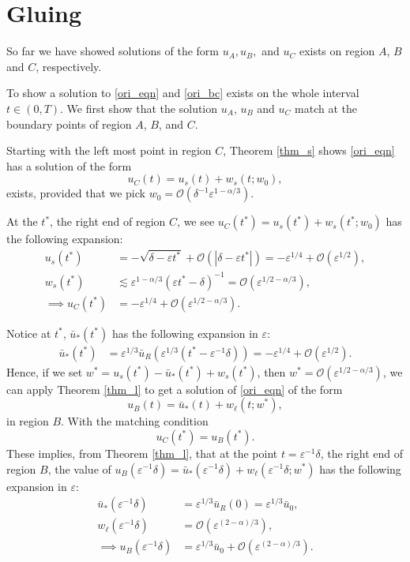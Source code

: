 \documentclass[letterpaper,11pt]{article}
\newcommand{\rmO}{\mathcal{O}}
\newcommand{\eps}{\varepsilon}
\newcommand{\lar}{ \lesssim }
\numberwithin{equation}{section}
\theoremstyle{plain}
\begin{document}
\section{Gluing}\label{sec_glue}
So far we have showed solutions of the form $u_A,u_B,$ and $u_C$ exists on region $A$, $B$ and $C$, respectively. 

To show a solution to \eqref{ori_eqn} and \eqref{ori_bc} exists on the whole interval $t\in (0, T)$. We first show that the solution $u_A$, $u_B$ and $u_C$ match at the boundary points of region $A$, $B$, and $C$.

Starting with the left most point in region $C$, Theorem \ref{thm_s} shows \eqref{ori_eqn} has
a solution of the form
\[
u_C(t) = u_s(t) + w_s(t;w_0),
\]
exists, provided that we pick $w_0= \rmO(\delta^{-1}\eps^{1-\alpha/3})$.

At the $t^*$, the right end of region $C$, we see $u_C(t^*) = u_s(t^*) + w_s(t^*; w_0)$ has the following expansion:
\begin{align*}
u_s(t^*) &= -\sqrt{\delta-\eps t^*}+\rmO(|\delta-\eps t^*|) = -\eps^{1/4}+\rmO(\eps^{1/2}),\\
w_s(t^*) &\lar \eps^{1-\alpha/3}(\eps t^*-\delta)^{-1} =  \rmO(\eps^{1/2-\alpha/3}),\\
\implies u_C(t^*) &= -\eps^{1/4} + \rmO(\eps^{1/2-\alpha/3}).
\end{align*}


Notice at $t^*$, $\bar{u}_*(t^*)$ has the following expansion in $\eps$:
\begin{align*}
\bar{u}_*(t^*) &= \eps^{1/3}\bar{u}_R(\eps^{1/3}(t^*-\eps^{-1}\delta)) = -\eps^{1/4}+ \rmO(\eps^{1/2}).
\end{align*}
Hence, if we set $w^* = u_s(t^*)-\bar{u}_*(t^*)+w_s(t^*)$, then $w^* = \rmO(\eps^{1/2-\alpha/3})$, we can apply Theorem \ref{thm_l} to get a solution of \eqref{ori_eqn} of the form
\[
u_B(t) = \bar{u}_*(t) + w_\ell(t; w^*),
\]
in region $B$. With the matching condition
\begin{equation} \label{match_bc}
u_C(t^*) = u_B(t^*).
\end{equation}
These implies, from Theorem \ref{thm_l}, that at the point $t=\eps^{-1}\delta$, the right end of region $B$, the value of $u_B(\eps^{-1}\delta) = \bar{u}_*(\eps^{-1}\delta)  + w_\ell(\eps^{-1}\delta; w^*)$ has the following expansion in $\eps$:
\begin{align*}
\bar{u}_*(\eps^{-1}\delta) &= \eps^{1/3}\bar{u}_R(0) = \eps^{1/3}\bar{u}_0, \\
w_\ell(\eps^{-1}\delta) &=  \rmO(\eps^{(2-\alpha)/3}), \\
\implies u_B(\eps^{-1}\delta) &= \eps^{1/3} \bar{u}_0+\rmO(\eps^{(2-\alpha)/3}).
\end{align*}
\end{document}
